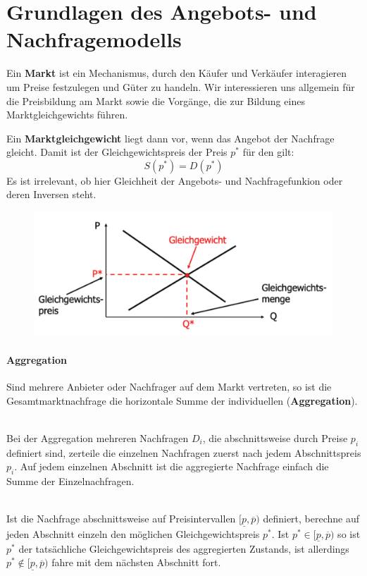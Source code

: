 \chapter{Grundlagen des Angebots- und Nachfragemodells}

Ein \textbf{Markt} ist ein Mechanismus, durch den Käufer und Verkäufer interagieren um Preise festzulegen und Güter zu handeln. Wir interessieren uns allgemein für die Preisbildung am Markt sowie die Vorgänge, die zur Bildung eines Marktgleichgewichts führen. ~\bigskip

Ein \textbf{Marktgleichgewicht} liegt dann vor, wenn das Angebot der Nachfrage gleicht. Damit ist der Gleichgewichtspreis der Preis $p^*$ für den gilt:
	$$ S(p^*) = D(p^*) $$
Es ist irrelevant, ob hier Gleichheit der Angebots- und Nachfragefunkion oder deren Inversen steht.

\begin{figure}[!htbp] \centering
	\includegraphics[scale=0.25]{img/marktgleichgewicht}
\end{figure}

\subsubsection*{Aggregation}

Sind mehrere Anbieter oder Nachfrager auf dem Markt vertreten, so ist die Gesamtmarktnachfrage die horizontale Summe der individuellen (\textbf{Aggregation}).

\begin{kr} ~\\
	Bei der Aggregation mehreren Nachfragen $D_i$, die abschnittsweise durch Preise $p_i$ definiert sind, zerteile die einzelnen Nachfragen zuerst nach jedem Abschnittspreis $p_i$. Auf jedem einzelnen Abschnitt ist die aggregierte Nachfrage einfach die Summe der Einzelnachfragen.  
\end{kr}

\begin{kr} ~\\
	Ist die Nachfrage abschnittsweise auf Preisintervallen $[\underline{p}, \overline{p})$ definiert, berechne auf jeden Abschnitt einzeln den möglichen Gleichgewichtspreis $p^*$. Ist $p^* \in [\underline{p}, \overline{p})$ so ist $p^*$ der tatsächliche Gleichgewichtspreis des aggregierten Zustands, ist allerdings $p^* \notin [\underline{p}, \overline{p})$ fahre mit dem nächsten Abschnitt fort.
\end{kr}~\newpage

